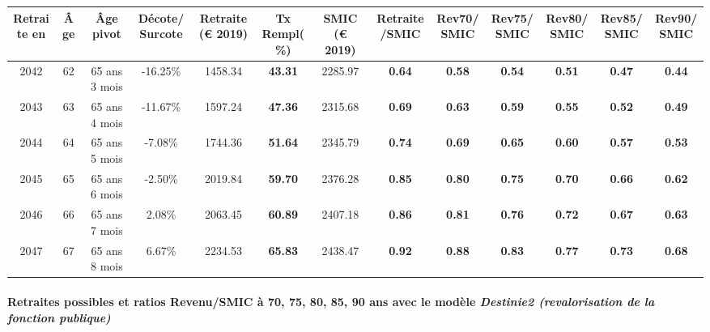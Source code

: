 { \scriptsize \begin{center} 
\begin{tabular}[htb]{|c|c||c|c||c|c||c||c|c|c|c|c|c|} 
\hline 
 Retraite en &  Âge &  Âge pivot &  Décote/Surcote &  Retraite (\euro{} 2019) &  Tx Rempl(\%) &  SMIC (\euro{} 2019) &  Retraite/SMIC &  Rev70/SMIC &  Rev75/SMIC &  Rev80/SMIC &  Rev85/SMIC &  Rev90/SMIC \\ 
\hline \hline 
 2042 &  62 &  65 ans 3 mois &  -16.25\% &  1458.34 &  {\bf 43.31} &  2285.97 &  {\bf {\color{red} 0.64}} &  {\bf {\color{red} 0.58}} &  {\bf {\color{red} 0.54}} &  {\bf {\color{red} 0.51}} &  {\bf {\color{red} 0.47}} &  {\bf {\color{red} 0.44}} \\ 
\hline 
 2043 &  63 &  65 ans 4 mois &  -11.67\% &  1597.24 &  {\bf 47.36} &  2315.68 &  {\bf {\color{red} 0.69}} &  {\bf {\color{red} 0.63}} &  {\bf {\color{red} 0.59}} &  {\bf {\color{red} 0.55}} &  {\bf {\color{red} 0.52}} &  {\bf {\color{red} 0.49}} \\ 
\hline 
 2044 &  64 &  65 ans 5 mois &  -7.08\% &  1744.36 &  {\bf 51.64} &  2345.79 &  {\bf {\color{red} 0.74}} &  {\bf {\color{red} 0.69}} &  {\bf {\color{red} 0.65}} &  {\bf {\color{red} 0.60}} &  {\bf {\color{red} 0.57}} &  {\bf {\color{red} 0.53}} \\ 
\hline 
 2045 &  65 &  65 ans 6 mois &  -2.50\% &  2019.84 &  {\bf 59.70} &  2376.28 &  {\bf {\color{red} 0.85}} &  {\bf {\color{red} 0.80}} &  {\bf {\color{red} 0.75}} &  {\bf {\color{red} 0.70}} &  {\bf {\color{red} 0.66}} &  {\bf {\color{red} 0.62}} \\ 
\hline 
 2046 &  66 &  65 ans 7 mois &  2.08\% &  2063.45 &  {\bf 60.89} &  2407.18 &  {\bf {\color{red} 0.86}} &  {\bf {\color{red} 0.81}} &  {\bf {\color{red} 0.76}} &  {\bf {\color{red} 0.72}} &  {\bf {\color{red} 0.67}} &  {\bf {\color{red} 0.63}} \\ 
\hline 
 2047 &  67 &  65 ans 8 mois &  6.67\% &  2234.53 &  {\bf 65.83} &  2438.47 &  {\bf {\color{red} 0.92}} &  {\bf {\color{red} 0.88}} &  {\bf {\color{red} 0.83}} &  {\bf {\color{red} 0.77}} &  {\bf {\color{red} 0.73}} &  {\bf {\color{red} 0.68}} \\ 
\hline 
\hline 
\end{tabular} 
\end{center} } 
\paragraph{Retraites possibles et ratios Revenu/SMIC à 70, 75, 80, 85, 90 ans avec le modèle \emph{Destinie2 (revalorisation de la fonction publique)}}  
 
